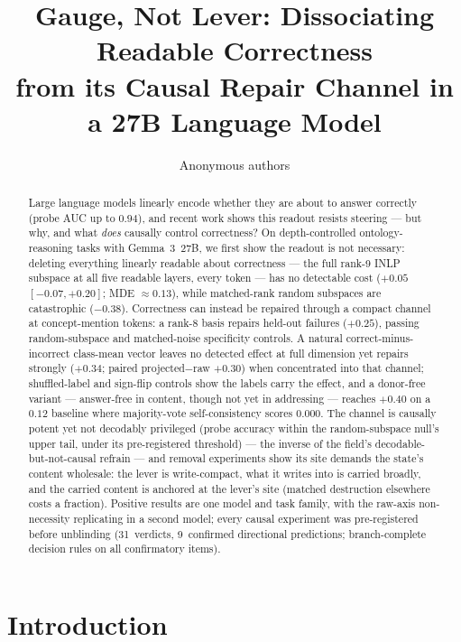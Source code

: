 \documentclass{article} %
\title{Gauge, Not Lever: Dissociating Readable Correctness\\
from its Causal Repair Channel in a 27B Language Model}
\author{Anonymous authors}
\begin{document}
\maketitle

\begin{abstract}
Large language models linearly encode whether they are about to answer
correctly (probe AUC up to $0.94$), and recent work shows this readout
resists steering --- but why, and what \emph{does} causally control
correctness? On depth-controlled ontology-reasoning tasks with
Gemma~3~27B, we first show the readout is not necessary: deleting
everything linearly readable about correctness --- the full rank-9 INLP
subspace at all five readable layers, every token --- has no
detectable cost ($+0.05$ $[-0.07,+0.20]$; MDE $\approx 0.13$), while matched-rank random subspaces are
catastrophic ($-0.38$). Correctness can instead be repaired through a
compact channel at concept-mention tokens: a rank-8 basis repairs
held-out failures ($+0.25$), passing random-subspace and matched-noise
specificity controls. A natural correct-minus-incorrect class-mean
vector leaves no detected effect at full dimension yet repairs strongly
($+0.34$; paired projected$-$raw $+0.30$) when concentrated into that
channel; shuffled-label and sign-flip controls
show the labels carry the effect, and a donor-free variant ---
answer-free in content, though not yet in addressing --- reaches
$+0.40$ on a $0.12$ baseline where majority-vote
self-consistency scores $0.000$. The channel is causally potent yet not
decodably privileged (probe accuracy within the random-subspace
null's upper tail, under its pre-registered threshold)
--- the inverse of the field's decodable-but-not-causal refrain --- and
removal experiments show its site demands the state's content
wholesale: the lever is write-compact, what it writes into is
carried broadly, and the carried content is anchored at the lever's
site (matched destruction elsewhere costs a fraction). Positive results are one model and task family, with
the raw-axis non-necessity replicating in a second model; every causal
experiment was pre-registered before unblinding
(31~verdicts, 9~confirmed directional predictions; branch-complete
decision rules on all confirmatory items).
\end{abstract}

\section{Introduction}\label{sec:intro}
\end{document}
